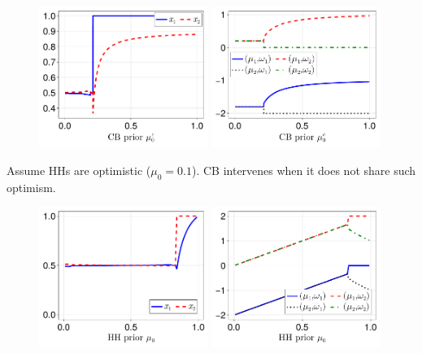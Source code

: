 \documentclass{beamer}
\begin{document}
\begin{frame}[allowframebreaks]
    \framebreak
    \begin{figure}[htp!]
    \centering
    \includegraphics[width=0.49\textwidth]{figures/V9/γ_1/fig_optimal_x_μ_0_c_μ_0_0.1.pdf}
    \includegraphics[width=0.49\textwidth]{figures/V9/γ_1/fig_optimal_γ_μ_0_c_μ_0_0.1.pdf}
    \end{figure}
    Assume HHs are optimistic ($\mu_0 = 0.1$). CB intervenes when it does not share such optimism.
    \vskip10pt
    \framebreak
    \begin{figure}[htp!]
    \centering
    \includegraphics[width=0.49\textwidth]{figures/V8/γ_1/fig_optimal_π_across_μ_0_ω_1_2_ω_2_-1_δ_0.5_.pdf}
    \includegraphics[width=0.49\textwidth]{figures/V8/γ_1/fig_posterior_across_μ_0_ω_1_2_ω_2_-1_δ_0.5_.pdf}

\end{figure}
\end{frame}
\end{document}
